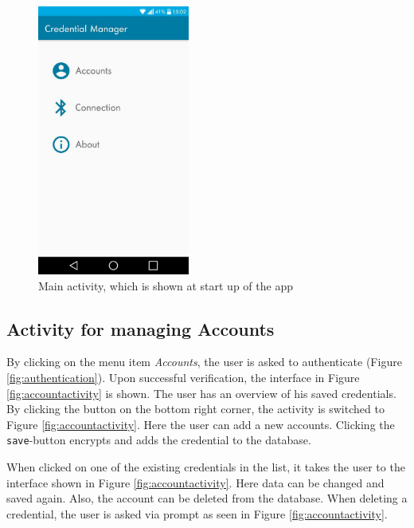 \begin{figure}[!htb]
\centering
\includegraphics[width=5cm]{images/MainActivityNew}
\caption[Main Activity]{Main activity, which is shown at start up of the app}
\label{fig:mainactivity}
\end{figure}


\subsection{Activity for managing Accounts}
By clicking on the menu item \textit{Accounts}, the user is asked to authenticate (Figure \ref{fig:authentication}\protect{}). Upon successful verification, the interface in Figure \ref{fig:accountactivity}\protect{} is shown. The user has an overview of his saved credentials. By clicking the button on the bottom right corner, the activity is switched to Figure \ref{fig:accountactivity}\protect{}. Here the user can add a new accounts. Clicking the \texttt{save}-button encrypts and adds the credential to the database.

When clicked on one of the existing credentials in the list, it takes the user to the interface shown in Figure \ref{fig:accountactivity}\protect{}.  Here data can be changed and saved again. Also, the account can be deleted from the database. When deleting a credential, the user is asked via prompt as seen in Figure \ref{fig:accountactivity}\protect{}.

